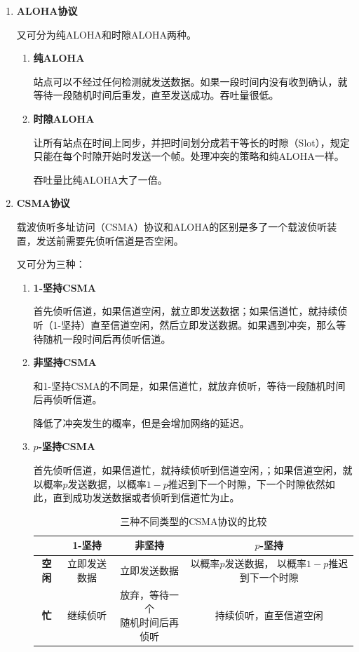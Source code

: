 \documentclass[12pt, a4paper, oneside]{ctexart}
\begin{document}
\begin{enumerate}
    \item {\bf ALOHA协议}
    
    又可分为纯ALOHA和时隙ALOHA两种。
    \begin{enumerate}
        \item {\bf 纯ALOHA}
        
        站点可以不经过任何检测就发送数据。如果一段时间内没有收到确认，就等待一段随机时间后重发，直至发送成功。吞吐量很低。
        \item {\bf 时隙ALOHA}
        
        让所有站点在时间上同步，并把时间划分成若干等长的时隙（Slot），规定只能在每个时隙开始时发送一个帧。处理冲突的策略和纯ALOHA一样。

        吞吐量比纯ALOHA大了一倍。

    \end{enumerate}
    \item {\bf CSMA协议}
    
    载波侦听多址访问（CSMA）协议和ALOHA的区别是多了一个载波侦听装置，发送前需要先侦听信道是否空闲。

    又可分为三种：
    \begin{enumerate}
        \item {\bf 1-坚持CSMA}
        
        首先侦听信道，如果信道空闲，就立即发送数据；如果信道忙，就持续侦听（1-坚持）直至信道空闲，然后立即发送数据。如果遇到冲突，那么等待随机一段时间后再侦听信道。

        \item {\bf 非坚持CSMA}
        
        和1-坚持CSMA的不同是，如果信道忙，就放弃侦听，等待一段随机时间后再侦听信道。

        降低了冲突发生的概率，但是会增加网络的延迟。

        \item {\bf $p$-坚持CSMA}
        
        首先侦听信道，如果信道忙，就持续侦听到信道空闲，；如果信道空闲，就以概率$p$发送数据，以概率$1-p$推迟到下一个时隙，下一个时隙依然如此，直到成功发送数据或者侦听到信道忙为止。

        \begin{table}[h]
            \centering
            \caption{三种不同类型的CSMA协议的比较}
            \begin{tabular}{|c|c|c|c|}
                \hline
                    & 1-坚持 & 非坚持 & $p$-坚持 \\
                \hline
                \textbf{空闲} & 立即发送数据 & 立即发送数据 & \makecell{以概率$p$发送数据，\\ 以概率$1-p$推迟到下一个时隙} \\
                \hline
                \textbf{忙} & 继续侦听 & \makecell{放弃，等待一个\\ 随机时间后再侦听} & 持续侦听，直至信道空闲 \\
                \hline
            \end{tabular}
        \end{table}
    \end{enumerate}


\end{enumerate}
\end{document}
